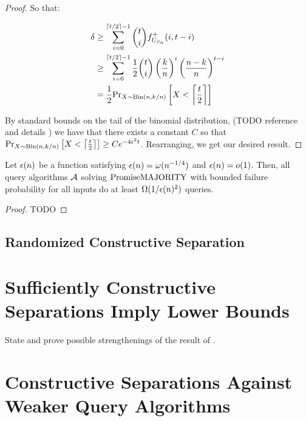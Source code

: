 \begin{proof}
So that:

\begin{align*}
\delta & \geq \sum_{i=0}^{\lceil t/2 \rceil-1} \binom{t}{i} f^+_{U_{S_n}}(i, t-i) \\
       & \geq \sum_{i=0}^{\lceil t/2 \rceil-1} \frac{1}{2} \binom{t}{i} \left(\frac{k}{n}\right)^i \left(\frac{n-k}{n} \right)^{t-i} \\
       & = \frac{1}{2} \text{Pr}_{X \sim \text{Bin}(n, k/n)}\left[X < \left\lceil \frac{t}{2} \right\rceil\right]
\end{align*}

By standard bounds on the tail of the binomial distribution,
(TODO reference and details )
we have that there exists a constant $C$ so that 
$\text{Pr}_{X \sim \text{Bin}(n, k/n)}\left[X < \left\lceil \frac{t}{2} \right\rceil\right] \geq C e^{-4\epsilon^2t}$.
Rearranging, we get our desired result. 

\end{proof}

\begin{corollary}
Let $\epsilon(n)$ be a function satisfying $\epsilon(n) = \omega(n^{-1/4})$ and $\epsilon(n) = o(1)$. Then, all query
algorithms $\mathcal{A}$ solving $\mathrm{PromiseMAJORITY}$ with bounded failure probability for all inputs do at least $\Omega(1/\epsilon(n)^2)$
queries. 
\end{corollary}
\begin{proof}
TODO 
\end{proof}

\subsection{Randomized Constructive Separation}



\section{Sufficiently Constructive Separations Imply Lower Bounds}

State and prove possible strengthenings of the result of \cite{ConstructiveSeparations}. 

\thmcsrefuterqa*

\section{Constructive Separations Against Weaker Query Algorithms}

